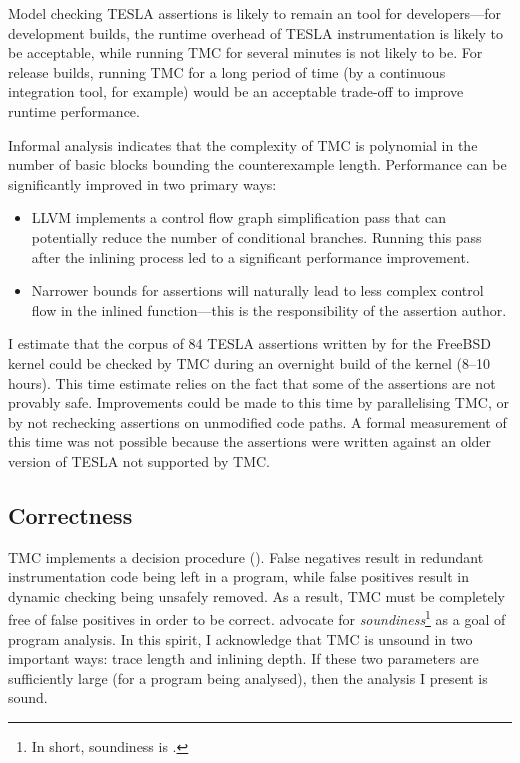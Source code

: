 Model checking TESLA assertions is likely to remain an  tool
for developers---for development builds, the runtime overhead of TESLA
instrumentation is likely to be acceptable, while running TMC for several
minutes is not likely to be. For release builds, running TMC for a long period
of time (by a continuous integration tool, for example) would be an acceptable
trade-off to improve runtime performance.

Informal analysis indicates that the complexity of TMC is polynomial in the
number of basic blocks bounding the counterexample length. Performance can be
significantly improved in two primary ways:
\begin{itemize}
  \item LLVM implements a control flow graph simplification pass that can
    potentially reduce the number of conditional branches. Running this pass
    after the inlining process led to a significant performance improvement.
  \item Narrower bounds for assertions will naturally lead to less complex
    control flow in the inlined function---this is the responsibility of the
    assertion author.
\end{itemize}

I estimate that the corpus of 84 TESLA assertions written by
\textcite{anderson_tesla:_2014} for the FreeBSD kernel could be checked by TMC
during an overnight build of the kernel (8--10 hours). This time estimate relies
on the fact that some of the assertions are not provably safe. Improvements
could be made to this time by parallelising TMC, or by not rechecking assertions
on unmodified code paths. A formal measurement of this time was not possible
because the assertions were written against an older version of TESLA not
supported by TMC.

\subsection{Correctness} \label{sec:soundiness}

TMC implements a decision procedure (). False negatives result in redundant instrumentation code being left
in a program, while false positives result in dynamic checking being unsafely
removed. As a result, TMC must be completely free of false positives in order to
be correct.  \textcite{livshits_defense_2015} advocate for
\emph{soundiness}\footnote{In short, soundiness is .} as a goal of program analysis. In this spirit, I
acknowledge that TMC is unsound in two important ways: trace length and inlining
depth. If these two parameters are sufficiently large (for a program being
analysed), then the analysis I present is sound.

